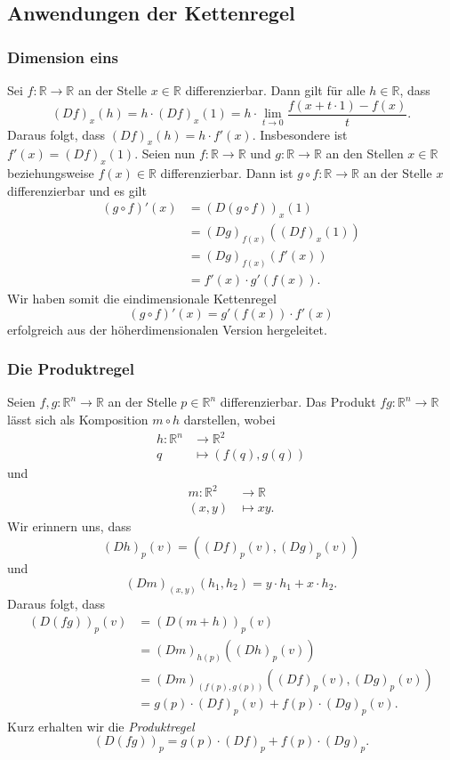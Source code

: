 \documentclass[../main.tex]{subfiles}
\begin{document}
\subsection*{Anwendungen der Kettenregel}
\subsubsection*{Dimension eins}
Sei $f \colon \mathbb{R} \to \mathbb{R}$ 
an der Stelle $x \in \mathbb{R}$ differenzierbar.
Dann gilt für alle $h \in \mathbb{R}$,
dass
\[
  {(Df)}_x(h) = h \cdot {(Df)}_x(1) = h \cdot
  \lim_{t \to 0} \frac{f(x + t \cdot 1) - f(x)}{t}.
\]
Daraus folgt, dass ${(Df)}_x(h) = h \cdot f'(x)$.
Insbesondere ist $f'(x) = {(Df)}_x(1)$.
Seien nun $f \colon \mathbb{R} \to \mathbb{R}$ und
$g \colon \mathbb{R} \to \mathbb{R}$ an den Stellen
$x \in \mathbb{R}$ beziehungsweise
$f(x) \in \mathbb{R}$ differenzierbar.
Dann ist $g \circ f \colon \mathbb{R} \to \mathbb{R}$ 
an der Stelle $x$ differenzierbar und es gilt
\begin{align*}
   {(g \circ f)}'(x)  
   & = {(D(g \circ f ))}_x(1) \\
   &={(Dg)}_{f(x)} ({(Df)}_x(1)) \\
   &  = {(Dg)}_{f(x)}(f'(x)) \\
   &= f'(x) \cdot g'(f(x)).
\end{align*}
Wir haben somit die eindimensionale Kettenregel
\[
  {(g \circ f)}'(x) = g'(f(x)) \cdot f'(x)
\]
erfolgreich aus der höherdimensionalen
Version hergeleitet.

\subsubsection*{Die Produktregel}
Seien $f, g \colon \mathbb{R}^n \to \mathbb{R}$ an der
Stelle $p \in \mathbb{R}^n$ differenzierbar.
Das Produkt $f g \colon \mathbb{R}^n \to \mathbb{R}$ 
lässt sich als Komposition
$m \circ h$ darstellen, wobei
\begin{align*}
  h \colon \mathbb{R}^n & \to \mathbb{R}^2 \\
  q & \mapsto (f(q), g(q))
\end{align*}
und
\begin{align*}
  m \colon \mathbb{R}^2 & \to \mathbb{R} \\
  (x, y) & \mapsto xy.
\end{align*}
Wir erinnern uns, dass
\[
  {(Dh)}_p(v) = ({(Df)}_p(v), {(Dg)}_p(v))
\]
und
\[
  {(Dm)}_{(x, y)} (h_1, h_2) = y \cdot h_1 + x \cdot h_2.
\]
Daraus folgt, dass
\begin{align*}
  {(D(fg))}_p(v) 
  &= {(D(m+h))}_p(v) \\
  &= {(Dm)}_{h(p)}({(Dh)}_p(v))\\
  &= {(Dm)}_{(f(p), g(p))} ({(Df)}_p(v), {(Dg)}_p(v)) \\
  &= g(p) \cdot {(Df)}_p(v) + f(p) \cdot {(Dg)}_p(v).
\end{align*}
Kurz erhalten wir die \emph{Produktregel}
\[
  {(D(fg))}_p = g(p) \cdot {(Df)}_p + f(p) \cdot {(Dg)}_p.
\]
\end{document}
